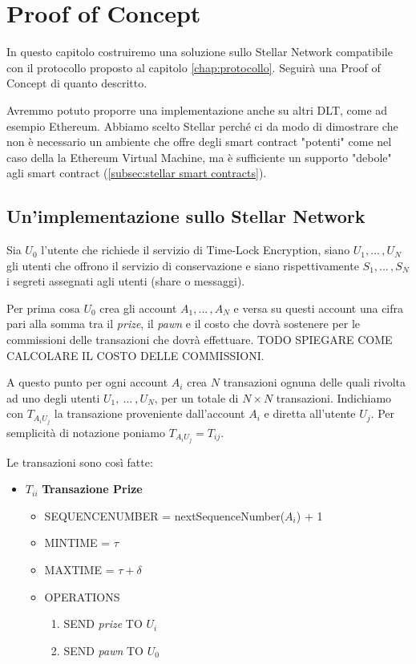\chapter{Proof of Concept}

In questo capitolo costruiremo una soluzione sullo Stellar Network
compatibile con il protocollo proposto al capitolo \ref{chap:protocollo}.
Seguirà una Proof of Concept di quanto descritto.

Avremmo potuto proporre una
implementazione anche su altri DLT, come ad esempio Ethereum. Abbiamo scelto
Stellar perché ci da modo di dimostrare che non è necessario un ambiente che
offre degli smart contract "potenti" come nel caso della la Ethereum Virtual Machine,
ma è sufficiente un supporto
"debole" agli smart contract (\ref{subsec:stellar smart contracts}).


\section{Un'implementazione sullo Stellar Network}
Sia $ U_0 $ l'utente che richiede il servizio di Time-Lock Encryption,
siano $ U_1, ...\, , U_N $ gli utenti che offrono il servizio di conservazione e
siano rispettivamente $ S_1, ...\, , S_N $ i segreti assegnati agli utenti
(share o messaggi).

Per prima cosa $ U_0 $ crea gli account $ A_1, ...\, , A_N $ e
versa su questi account una cifra pari alla somma tra
il \textit{prize}, il \textit{pawn} e il costo che dovrà sostenere per le commissioni
delle transazioni che dovrà effettuare.
TODO SPIEGARE COME CALCOLARE IL COSTO DELLE COMMISSIONI.

A questo punto per ogni account $ A_i $ crea $ N $ transazioni
ognuna delle quali rivolta ad uno degli utenti $ U_1,\ ...\ , U_N $, per un totale
di $ N \times N $ transazioni. Indichiamo con $ T_{{A_i}{U_j}} $ la transazione
proveniente dall'account $ A_i $ e diretta all'utente $ U_j $.
Per semplicità di notazione poniamo $ T_{{A_i}{U_j}} = T_{ij} $.

Le transazioni sono così fatte:
\begin{itemize}
	\item $T_{ii} $ \textbf{Transazione Prize}
	      \begin{itemize}
		      \item SEQUENCE\textunderscore NUMBER = nextSequenceNumber($ A_i $) + 1
		      \item MIN\textunderscore TIME = $ \tau $
		      \item MAX\textunderscore TIME = $ \tau + \delta $
		      \item OPERATIONS
		            \begin{enumerate}
			            \item SEND \textit{prize} TO $ U_i $
			            \item SEND \textit{pawn} TO $ U_0 $
		            \end{enumerate}
	      \end{itemize}
\end{itemize}

